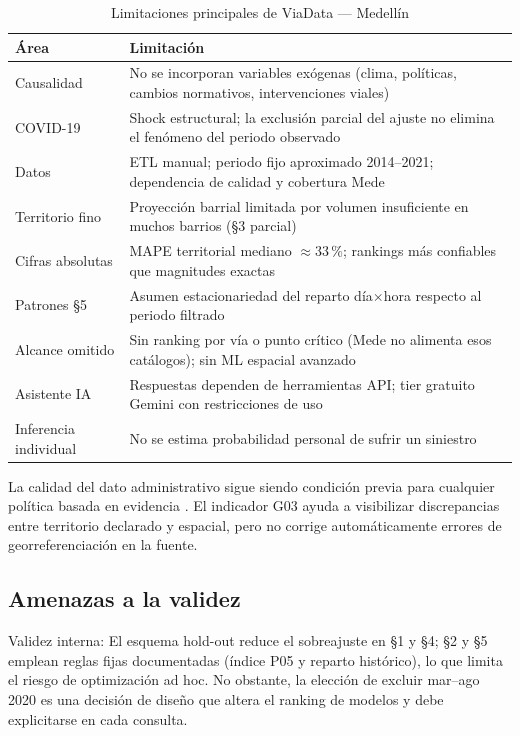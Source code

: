 \begin{table}[H]
	\centering
	\caption{Limitaciones principales de ViaData — Medellín}
	\label{tab:limitaciones}
	\small
	\begin{tabularx}{\linewidth}{@{}l X@{}}
		\toprule
		Área & Limitación \\
		\midrule
		Causalidad & No se incorporan variables exógenas (clima, políticas, cambios normativos, intervenciones viales) \\
		COVID-19 & Shock estructural; la exclusión parcial del ajuste no elimina el fenómeno del periodo observado \\
		Datos & ETL manual; periodo fijo aproximado 2014--2021; dependencia de calidad y cobertura Mede \\
		Territorio fino & Proyección barrial limitada por volumen insuficiente en muchos barrios (§3 parcial) \\
		Cifras absolutas & MAPE territorial mediano $\approx 33\,\%$; rankings más confiables que magnitudes exactas \\
		Patrones §5 & Asumen estacionariedad del reparto día$\times$hora respecto al periodo filtrado \\
		Alcance omitido & Sin ranking por vía o punto crítico (Mede no alimenta esos catálogos); sin ML espacial avanzado \\
		Asistente IA & Respuestas dependen de herramientas API; tier gratuito Gemini con restricciones de uso \\
		Inferencia individual & No se estima probabilidad personal de sufrir un siniestro \\
		\bottomrule
	\end{tabularx}
\end{table}

La calidad del dato administrativo sigue siendo condición previa para cualquier política basada en evidencia \cite{oviedo2025,atancuri2024}. El indicador G03 ayuda a visibilizar discrepancias entre territorio declarado y espacial, pero no corrige automáticamente errores de georreferenciación en la fuente.

\subsection{Amenazas a la validez}

Validez interna: El esquema hold-out reduce el sobreajuste en §1 y §4; §2 y §5 emplean reglas fijas documentadas (índice P05 y reparto histórico), lo que limita el riesgo de optimización ad hoc. No obstante, la elección de excluir mar--ago 2020 es una decisión de diseño que altera el ranking de modelos y debe explicitarse en cada consulta.

